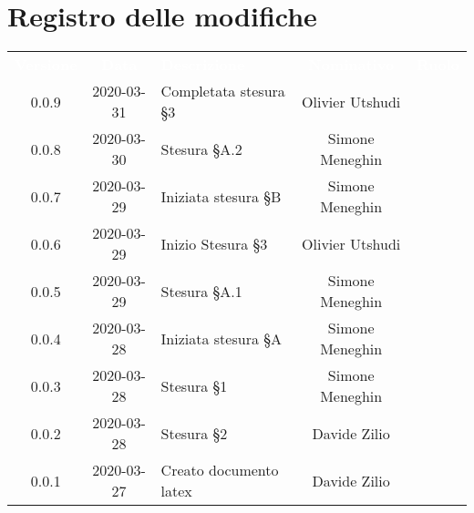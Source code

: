 \section*{Registro delle modifiche}
{
	\centering
	\begin{longtable}{ c c  C{4cm}  c  c }
		\textcolor{white}{\textbf{Versione}} & \textcolor{white}{\textbf{Data}} & \textcolor{white}{\textbf{Descrizione}} & \textcolor{white}{\textbf{Nominativo}} & \textcolor{white}{\textbf{Ruolo}}\\		
		0.0.9 & 2020-03-31 & Completata stesura \S 3 & Olivier Utshudi &\reda{} \\
		0.0.8 & 2020-03-30 & Stesura \S A.2 & Simone Meneghin &\reda{} \\
		0.0.7 & 2020-03-29 & Iniziata stesura \S B & Simone Meneghin &\reda{} \\
		0.0.6 & 2020-03-29 & Inizio Stesura \S 3 & Olivier Utshudi &\reda{} \\
		0.0.5 & 2020-03-29 & Stesura \S A.1 & Simone Meneghin &\reda{} \\
		0.0.4 & 2020-03-28 & Iniziata stesura \S A & Simone Meneghin &\reda{} \\
		0.0.3 & 2020-03-28 & Stesura \S 1 & Simone Meneghin &\reda{} \\
		0.0.2 & 2020-03-28 & Stesura \S 2 & Davide Zilio &\reda{} \\
		0.0.1 & 2020-03-27 & Creato documento latex & Davide Zilio &\reda{}\\		
		
	\end{longtable}

}